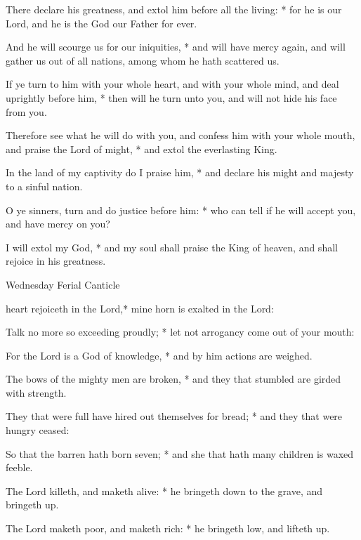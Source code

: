 \begin{multicols}{2}
There declare his greatness, and extol him before all the living: * for he is our Lord, and he is the God our Father for ever.\par
And he will scourge us for our iniquities, * and will have mercy again, and will gather us out of all nations, among whom he hath scattered us.\par
If ye turn to him with your whole heart, and with your whole mind, {\dag} and deal uprightly before him, * then will he turn unto you, and will not hide his face from you.\par
Therefore see what he will do with you, and confess him with your whole mouth, and praise the Lord of might, * and extol the everlasting King.\par
In the land of my captivity do I praise him, * and declare his might and majesty to a sinful nation.\par
O ye sinners, turn and do justice before him: * who can tell if he will accept you, and have mercy on you?\par
I will extol my God, * and my soul shall praise the King of heaven, and shall rejoice in his greatness.
\begin{inhead}
Wednesday Ferial Canticle
\end{inhead}
 heart rejoiceth in the Lord,* mine horn is exalted in the Lord:\par
{}
Talk no more so exceeding proudly; * let not arrogancy come out of your mouth:\par
For the Lord is a God of knowledge, * and by him actions are weighed.\par
The bows of the mighty men are broken, * and they that stumbled are girded with strength.\par
They that were full have hired out themselves for bread; * and they that were hungry ceased:\par
So that the barren hath born seven; * and she that hath many children is waxed feeble.\par
The Lord killeth, and maketh alive: * he bringeth down to the grave, and bringeth up.\par
The Lord maketh poor, and maketh rich: * he bringeth low, and lifteth up.\par

\end{multicols}
